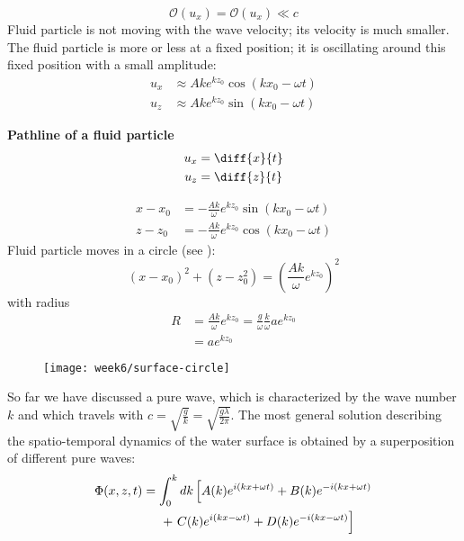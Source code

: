 \begin{equation}
\mathcal{O}(u_x) = \mathcal{O}(u_x) \ll c
\end{equation}
Fluid particle is not moving with the wave velocity; its velocity is much smaller. The fluid particle is more or less at a fixed position; it is oscillating around this fixed position with a small amplitude:
\begin{align}
u_x &\approx Ake^{kz_0}\cos(kx_0-\omega t)\\
u_z &\approx Ake^{kz_0}\sin(kx_0-\omega t)
\end{align}


\textbf{Pathline of a fluid particle}
\begin{align}
u_x &= \diff{x}{t}\\
u_z &= \diff{z}{t}
\end{align}

\begin{align}
x-x_0 &= -\frac{Ak}{\omega}e^{kz_0}\sin(kx_0-\omega t)\\
z-z_0 &= -\frac{Ak}{\omega}e^{kz_0}\cos(kx_0-\omega t)
\end{align}
Fluid particle moves in a circle (see ):
\begin{equation}
(x-x_0)^2+(z-z_0^2)=\left(\frac{Ak}{\omega}e^{kz_0}\right)^2
\end{equation}
with radius
\begin{align}
R &= \frac{Ak}{\omega}e^{kz_0}=\frac{g}{\omega}\frac{k}{\omega}ae^{kz_0}\\
&= ae^{kz_0}
\end{align}

\begin{figure}[!h]
    \centering
    \texttt{[image: week6/surface-circle]}\\
    \caption{}
    \label{fig:surface-circle}
\end{figure}

So far we have discussed a pure wave, which is characterized by the wave number $k$ and which travels with $c=\sqrt{\frac{g}{k}}=\sqrt{\frac{g\lambda}{2\pi}}$. The most general solution describing the spatio-temporal dynamics of the water surface is obtained by a superposition of different pure waves:
\begin{align}
\begin{split}
\Phi(x,z,t) &= \int_0^kdk\left[A(k)e^{i(kx+\omega t)}+B(k)e^{-i(kx+\omega t)}\right. \\
&\hspace{5mm}+\left.C(k)e^{i(kx-\omega t)}+D(k)e^{-i(kx-\omega t)}\right]
\end{split}
\end{align}

